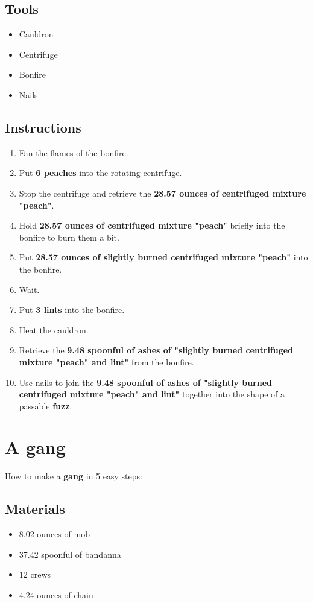 \documentclass{article}
\begin{document}
\subsection{Tools}\begin{itemize}
\item 
Cauldron
\item 
Centrifuge
\item 
Bonfire
\item 
Nails
\end{itemize}
\subsection{Instructions}\begin{enumerate}
\item 
Fan the flames of the bonfire.
\item 
Put \textbf{6 peaches} into the rotating centrifuge.
\item 
Stop the centrifuge and retrieve the \textbf{28.57 ounces of centrifuged mixture "peach"}.
\item 
Hold \textbf{28.57 ounces of centrifuged mixture "peach"} briefly into the bonfire to burn them a bit.
\item 
Put \textbf{28.57 ounces of slightly burned centrifuged mixture "peach"} into the bonfire.
\item 
Wait.
\item 
Put \textbf{3 lints} into the bonfire.
\item 
Heat the cauldron.
\item 
Retrieve the \textbf{9.48 spoonful of ashes of "slightly burned centrifuged mixture "peach" and lint"} from the bonfire.
\item 
Use nails to join the \textbf{9.48 spoonful of ashes of "slightly burned centrifuged mixture "peach" and lint"} together into the shape of a passable \textbf{fuzz}.
\end{enumerate}
\newpage
\section{A gang}How to make a \textbf{gang} in 5 easy steps:

\subsection{Materials}\begin{itemize}
\item 
8.02 ounces of mob
\item 
37.42 spoonful of bandanna
\item 
12 crews
\item 
4.24 ounces of chain
\end{itemize}
\end{document}
